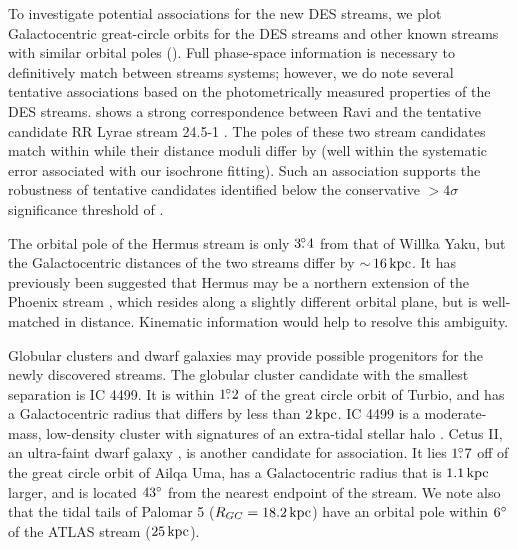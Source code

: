 \documentclass[twocolumn]{aastex61}
\begin{document}
To investigate potential associations for the new DES streams, we plot Galactocentric great-circle orbits for the DES streams and other known streams with similar orbital poles (). 
Full phase-space information is necessary to definitively match between streams systems; however, we do note several tentative associations based on the photometrically measured properties of the DES streams.
 shows a strong correspondence between Ravi and the tentative candidate RR Lyrae stream 24.5-1 \citep{Mateu:2017}.
The poles of these two stream candidates match within \CHECK{$3\degrees$} while their distance moduli differ by \CHECK{$\Delta(\mM) \sim 0.2 \magn$} (well within the systematic error associated with our isochrone fitting).
Such an association supports the robustness of tentative candidates identified below the conservative $>4\sigma$ significance threshold of \citet{Mateu:2017}.

The orbital pole of the Hermus stream \citep{Grillmair:2014} is only $3\mbox{$.\!\!^\circ$}4$ from that of Willka Yaku, but the Galactocentric distances of the two streams differ by $ {\sim}\, 16 \mathrm{\,kpc}$.
It has previously been suggested that Hermus may be a northern extension of the Phoenix stream \citep{Grillmair:2016b}, which resides along a slightly different orbital plane, but is well-matched in distance.
Kinematic information would help to resolve this ambiguity.

Globular clusters and dwarf galaxies may provide possible progenitors for the newly discovered streams.
The globular cluster candidate with the smallest separation is IC 4499. 
It is within $1\mbox{$.\!\!^\circ$}2$ of the great circle orbit of Turbio, and has a Galactocentric radius that differs by less than $2 \mathrm{\,kpc}$. IC 4499 is a moderate-mass, low-density cluster with signatures of an extra-tidal stellar halo \citep{Walker:2011}.
Cetus II, an ultra-faint dwarf galaxy \citep{Drlica-Wagner:2015}, is another candidate for association. It lies $1\mbox{$.\!\!^\circ$}7$ off of the great circle orbit of Ailqa Uma, has a Galactocentric radius that is $1.1 \mathrm{\,kpc}$ larger, and is located $43 {}^{\circ}$ from the nearest endpoint of the stream. 
We note also that the tidal tails of Palomar 5 ($R_{GC} = 18.2 \mathrm{\,kpc}$) have an orbital pole within $6{}^{\circ}$ of the ATLAS stream ($25 \mathrm{\,kpc}$). 
\end{document}
